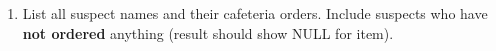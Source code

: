 \documentclass[12pt,a4paper]{article}
\begin{document}
\begin{enumerate}





    \item List all suspect names and their cafeteria orders. Include suspects who have \textbf{not ordered} anything (result should show NULL for item).


\end{enumerate}
\end{document}
